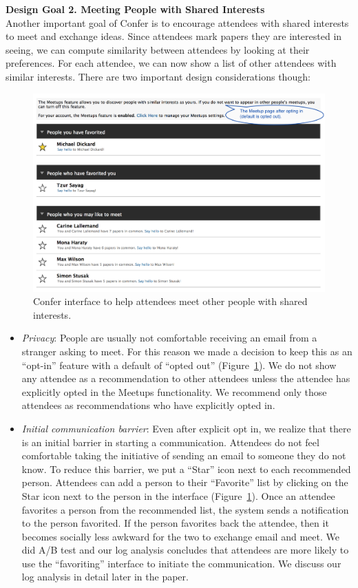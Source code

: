 \documentclass{sigchi}
\begin{document}
\textbf{Design Goal 2. Meeting People with Shared Interests}\\
Another important goal of Confer is to encourage attendees with shared interests to meet and exchange ideas. Since attendees mark papers they are interested in seeing, we can compute similarity between attendees by looking at their preferences. For each attendee, we can now show a list of other attendees with similar interests. There are two important design considerations though:
\begin{figure}[!h]
\centering
\includegraphics[width=0.95\columnwidth]{confer-meetup.png}
\caption{Confer interface to help attendees meet other people with shared interests.}
\label{confer-meetup}
\end{figure}
\begin {itemize}

\item \emph{Privacy}:  People are usually not comfortable receiving an email from a stranger asking to meet. For this reason we made a decision to keep this as an ``opt-in'' feature with a default of ``opted out'' (Figure~\ref{confer-meetup}). We do not show any attendee as a recommendation to other attendees unless the attendee has explicitly opted in the Meetups functionality. We recommend only those attendees as recommendations who have explicitly opted in.

\item \emph{Initial communication barrier}: Even after explicit opt in, we realize that there is an initial barrier in starting a communication. Attendees do not feel comfortable taking the initiative of sending an email to someone they do not know. To reduce this barrier, we put a ``Star'' icon next to each recommended person. Attendees can add a person to their ``Favorite'' list by clicking on the Star icon next to the person in the interface (Figure~\ref{confer-meetup}). Once an attendee favorites a person from the recommended list, the system sends a notification to the person favorited. If the person favorites back the attendee, then it becomes socially less awkward for the two to exchange email and meet. We did A/B test and our log analysis concludes that attendees are more likely to use the ``favoriting'' interface to initiate the communication. We discuss our log analysis in detail later in the paper.
\end {itemize}
\end{document}
